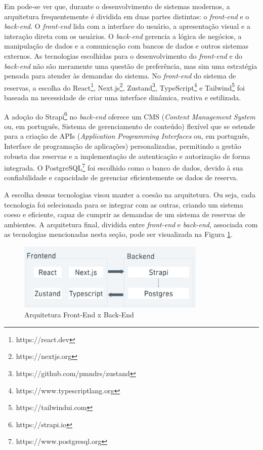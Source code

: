 \documentclass[12pt]{article}
\begin{document}
Em \cite{souto} pode-se ver que, durante o desenvolvimento de sistemas modernos, a arquitetura frequentemente é dividida em duas partes distintas: o \textit{front-end} e o \textit{back-end}. O \textit{front-end} lida com a interface do usuário, a apresentação visual e a interação direta com os usuários. O \textit{back-end} gerencia a lógica de negócios, a manipulação de dados e a comunicação com bancos de dados e outros sistemas externos. As tecnologias escolhidas para o desenvolvimento do \textit{front-end} e do \textit{back-end} não são meramente uma questão de preferência, mas sim uma estratégia pensada para atender às demandas do sistema. No \textit{front-end} do sistema de reservas, a escolha do React\footnote{https://react.dev}, Next.js\footnote{https://nextjs.org}, Zustand\footnote{https://github.com/pmndrs/zustand}, TypeScript\footnote{https://www.typescriptlang.org} e Tailwind\footnote{https://tailwindui.com} foi baseada na necessidade de criar uma interface dinâmica, reativa e estilizada.

A adoção do Strapi\footnote{https://strapi.io} no \textit{back-end} oferece um CMS (\textit{Content Management System} ou, em português, Sistema de gerenciamento de conteúdo) flexível que se estende para a criação de APIs (\textit{Application Programming Interfaces} ou, em português, Interface de programação de aplicações) personalizadas, permitindo a gestão robusta das reservas e a implementação de autenticação e autorização de forma integrada. O PostgreSQL\footnote{https://www.postgresql.org} foi escolhido como o banco de dados, devido à sua confiabilidade e capacidade de gerenciar eficientemente os dados de reserva.

A escolha dessas tecnologias visou manter a coesão na arquitetura. Ou seja, cada tecnologia foi selecionada para se integrar com as outras, criando um sistema coeso e eficiente, capaz de cumprir as demandas de um sistema de reservas de ambientes. A arquitetura final, dividida entre \textit{front-end} e \textit{back-end},  associada com as tecnologias mencionadas nesta seção, pode ser visualizada na Figura \ref{fig:arqui_e_tech}.

\begin{figure}[ht]
\centering
\includegraphics[width=0.8\textwidth]{arqui_e_tech.jpg}
\caption{Arquitetura Front-End x Back-End}
\label{fig:arqui_e_tech}
\end{figure}
\end{document}
